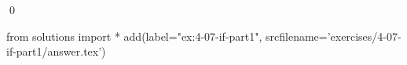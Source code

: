 
\begin{ex}
  \label{ex:4-07-if-part1}
  
  \qed
\end{ex}
\begin{python0}
from solutions import *
add(label="ex:4-07-if-part1",
    srcfilename='exercises/4-07-if-part1/answer.tex')
\end{python0}
